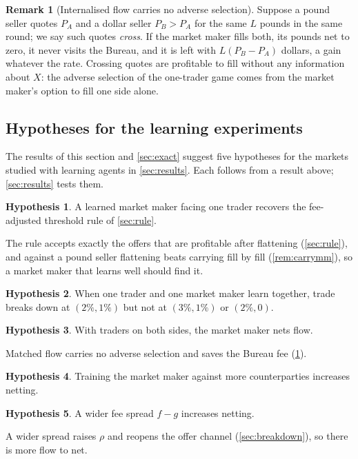 \documentclass[11pt,a4paper]{article}
\theoremstyle{plain}
\theoremstyle{definition}
\newtheorem{hypothesis}{Hypothesis}
\newtheorem{remark}[proposition]{Remark}
\newcommand{\1}{\mathbf{1}}
\begin{document}
\begin{remark}[Internalised flow carries no adverse selection]\label{rem:matched}
Suppose a pound seller quotes $P_A$ and a dollar seller $P_B>P_A$ for the same $L$ pounds in the same round; we say such quotes \emph{cross}. If the market maker fills both, its pounds net to zero, it never visits the Bureau, and it is left with $L(P_B-P_A)$ dollars, a gain whatever the rate. Crossing quotes are profitable to fill without any information about $X$: the adverse selection of the one-trader game comes from the market maker's option to fill one side alone.
\end{remark}

\subsection{Hypotheses for the learning experiments}\label{sec:hypotheses}
The results of this section and \cref{sec:exact} suggest five hypotheses for the markets studied with learning agents in \cref{sec:results}. Each follows from a result above; \cref{sec:results} tests them.
\begin{hypothesis}\label{h:threshold}A learned market maker facing one trader recovers the fee-adjusted threshold rule of \cref{sec:rule}.\end{hypothesis}
\noindent The rule accepts exactly the offers that are profitable after flattening (\cref{sec:rule}), and against a pound seller flattening beats carrying fill by fill (\cref{rem:carrymm}), so a market maker that learns well should find it.
\begin{hypothesis}\label{h:cotrain}When one trader and one market maker learn together, trade breaks down at $(2\%,1\%)$ but not at $(3\%,1\%)$ or $(2\%,0)$.\end{hypothesis}

\begin{hypothesis}\label{h:net}With traders on both sides, the market maker nets flow.\end{hypothesis}
\noindent Matched flow carries no adverse selection and saves the Bureau fee (\cref{rem:matched}).
\begin{hypothesis}\label{h:population}Training the market maker against more counterparties increases netting.\end{hypothesis}
\begin{hypothesis}\label{h:spread}A wider fee spread $f-g$ increases netting.\end{hypothesis}
\noindent A wider spread raises $\rho$ and reopens the offer channel (\cref{sec:breakdown}), so there is more flow to net.
\end{document}
